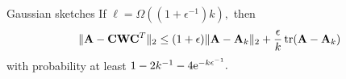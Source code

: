 \documentclass[xcolor=x11names,compress,ignorenonframetext]{beamer}
\renewcommand{\(}{\begin{columns}}
\renewcommand{\)}{\end{columns}}
\newcommand{\<}[1]{\begin{column}{#1}}
\renewcommand{\>}{\end{column}}
\def\refcolor{DodgerBlue4}
\newcommand{\refer}[1]{({\color{\refcolor}#1})}
\begin{document}
\begin{frame}

 \begin{block}{Gaussian sketches}
  If $\ell = \Omega((1 + \epsilon^{-1}) k),$ then
  \[
   \|\mathbf{A} - \mathbf{C} \mathbf{W} \mathbf{C}^T\|_2 \leq (1 + \epsilon) \|\mathbf{A} - \mathbf{A}_k\|_2 + \frac{\epsilon}{k}\operatorname{tr}(\mathbf{A} - \mathbf{A}_k)
  \]
  with probability at least $1 - 2k^{-1} - 4\mathrm{e}^{-k\epsilon^{-1}}.$
  \end{block}
  
\end{frame}

%  
 
\end{document}

